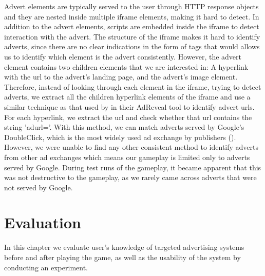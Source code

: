 \documentclass{l4proj}
\begin{document}
Advert elements are typically served to the user through HTTP response objects and they are nested inside multiple iframe elements, making it hard to detect. In addition to the advert elements, scripts are embedded inside the iframe to detect interaction with the advert. The structure of the iframe makes it hard to identify adverts, since there are no clear indications in the form of tags that would allows us to identify which element is the advert consistently. However, the advert element contains two children elements that we are interested in: A hyperlink with the url to the advert's landing page, and the advert's image element. Therefore, instead of looking through each element in the iframe, trying to detect adverts, we extract all the children hyperlink elements of the iframe and use a similar technique as that used by \cite{Liu2013} in their AdReveal tool to identify advert urls. For each hyperlink, we extract the url and check whether that url contains the string 'adurl='. With this method, we can match adverts served by Google's DoubleClick, which is the most widely used ad exchange by publishers (\cite{dclick}). However, we were unable to find any other consistent method to identify adverts from other ad exchanges which means our gameplay is limited only to adverts served by Google. During test runs of the gameplay, it became apparent that this was not destructive to the gameplay, as we rarely came across adverts that were not served by Google.

\chapter{Evaluation} 
In this chapter we evaluate user's knowledge of targeted advertising systems before and after playing the game, as well as the usability of the system by conducting an experiment. 
\end{document}
